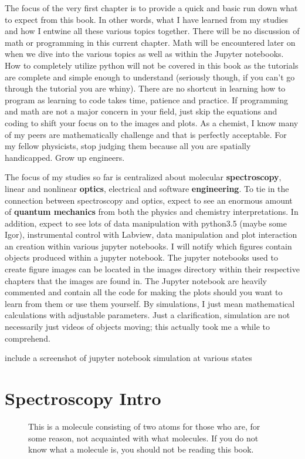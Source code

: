 \documentclass[11pt,a4paper]{book}
\newcommand{\imginput}[1]{} %
\begin{document}
	The focus of the very first chapter is to provide a quick and basic run down what to expect from this book. In other words, what I have learned from my studies and how I entwine all these various topics together. There will be no discussion of math or programming in this current chapter. Math will be encountered later on when we dive into the various topics as well as within the Jupyter notebooks. How to completely utilize python will not be covered in this book as the tutorials are complete and simple enough to understand (seriously though, if you can't go through the tutorial you are whiny). There are no shortcut in learning how to program as learning to code takes time, patience and practice. If programming and math are not a major concern in your field, just skip the equations and coding to shift your focus on to the images and plots. As a chemist, I know many of my peers are mathematically challenge and that is perfectly acceptable. For my fellow physicists, stop judging them because all you are spatially handicapped. Grow up engineers.
	
	The focus of my studies so far is centralized about molecular {\bfseries spectroscopy}, linear and nonlinear {\bfseries optics}, electrical and software {\bfseries engineering}. To tie in the connection between spectroscopy and optics, expect to see an enormous amount of {\bfseries quantum mechanics} from both the physics and chemistry interpretations. In addition, expect to see lots of data manipulation with python3.5 (maybe some Igor), instrumental control with Labview, data manipulation and plot interaction an creation within various jupyter notebooks. I will notify which figures contain objects produced within a jupyter notebook. The jupyter notebooks used to create figure images can be located in the images directory within their respective chapters that the images are found in. The Jupyter notebook are heavily commented and contain all the code for making the plots should you want to learn from them or use them yourself. By simulations, I just mean mathematical calculations with adjustable parameters. Just a clarification, simulation are not necessarily just videos of objects moving; this actually took me a while to comprehend.
	
	include a screenshot of jupyter notebook simulation at various states
	\section{Spectroscopy Intro}
		\label{sec:Spectroscopy Intro}
		\begin{figure} [!ht]
			\centering
			\def\svgwidth{\columnwidth}
			\huge
			\resizebox{8cm}{!}{\imginput{images/molecule.pdf_tex}}
			\caption{This is a molecule consisting of two atoms for those who are, for some reason, not acquainted with what molecules. If you do not know what a molecule is, you should not be reading this book.}
			\label{fig:molecule-alpha}
		\end{figure}
		
\end{document}
